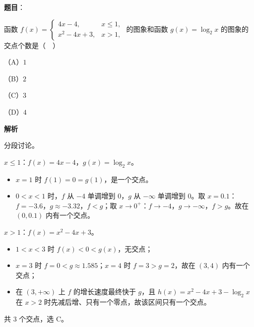 \begin{answer}

\textbf{题目}：

函数 $f(x)=\begin{cases}4x-4,&x\leqslant1,\\ x^2-4x+3,&x>1,\end{cases}$ 的图象和函数 $g(x)=\log_2 x$ 的图象的交点个数是（　）

（A）$1$

（B）$2$

（C）$3$

（D）$4$

\textbf{解析}

分段讨论。

$x\leqslant1$：$f(x)=4x-4$，$g(x)=\log_2x$。

\begin{itemize}
\item $x=1$ 时 $f(1)=0=g(1)$，是一个交点。
\item $0<x<1$ 时，$f$ 从 $-4$ 单调增到 $0$，$g$ 从 $-\infty$ 单调增到 $0$。取 $x=0.1$：$f=-3.6$，$g\approx-3.32$，$f<g$；取 $x\to0^+$：$f\to-4$，$g\to-\infty$，$f>g$。故在 $(0,0.1)$ 内有一个交点。
\end{itemize}

$x>1$：$f(x)=x^2-4x+3$。

\begin{itemize}
\item $1<x<3$ 时 $f(x)<0<g(x)$，无交点；
\item $x=3$ 时 $f=0<g\approx1.585$；$x=4$ 时 $f=3>g=2$，故在 $(3,4)$ 内有一个交点；
\item 在 $(3,+\infty)$ 上 $f$ 的增长速度最终快于 $g$，且 $h(x)=x^2-4x+3-\log_2x$ 在 $x>2$ 时先减后增、只有一个零点，故该区间只有一个交点。
\end{itemize}

共 $3$ 个交点，选 C。


\end{answer}

